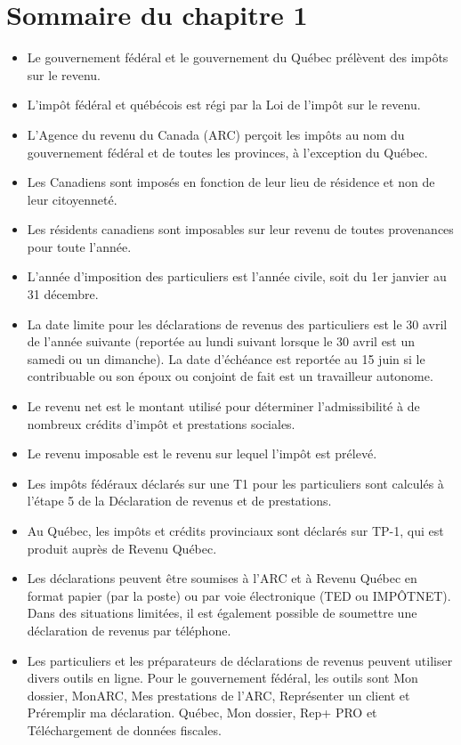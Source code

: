\section{Sommaire du chapitre 1}
\begin{itemize}
	\item Le gouvernement fédéral et le gouvernement du Québec prélèvent des impôts sur le revenu.
	\item L'impôt fédéral et québécois est régi par la Loi de l'impôt sur le revenu.
	\item L'Agence du revenu du Canada (ARC) perçoit les impôts au nom du gouvernement fédéral et de toutes les provinces, à l'exception du Québec.
	\item Les Canadiens sont imposés en fonction de leur lieu de résidence et non de leur citoyenneté.
	\item Les résidents canadiens sont imposables sur leur revenu de toutes provenances pour toute l'année.
	\item L'année d'imposition des particuliers est l'année civile, soit du 1er janvier au 31 décembre.
	\item La date limite pour les déclarations de revenus des particuliers est le 30 avril de l'année suivante (reportée au lundi suivant lorsque le 30 avril est un samedi ou un dimanche). La date d'échéance est reportée au 15 juin si le contribuable ou son époux ou conjoint de fait est un travailleur autonome.
	\item Le revenu net est le montant utilisé pour déterminer l'admissibilité à de nombreux crédits d'impôt et prestations sociales.
	\item Le revenu imposable est le revenu sur lequel l'impôt est prélevé.
	\item Les impôts fédéraux déclarés sur une T1 pour les particuliers sont calculés à l'étape 5 de la Déclaration de revenus et de prestations.
	\item Au Québec, les impôts et crédits provinciaux sont déclarés sur TP-1, qui est produit auprès de Revenu Québec.
	\item Les déclarations peuvent être soumises à l'ARC et à Revenu Québec en format papier (par la poste) ou par voie électronique (TED ou IMPÔTNET). Dans des situations limitées, il est également possible de soumettre une déclaration de revenus par téléphone.
	\item Les particuliers et les préparateurs de déclarations de revenus peuvent utiliser divers outils en ligne. Pour le gouvernement fédéral, les outils sont Mon dossier, MonARC, Mes prestations de l'ARC, Représenter un client et Préremplir ma déclaration. Québec, Mon dossier, Rep+ PRO et Téléchargement de données fiscales.
\end{itemize}